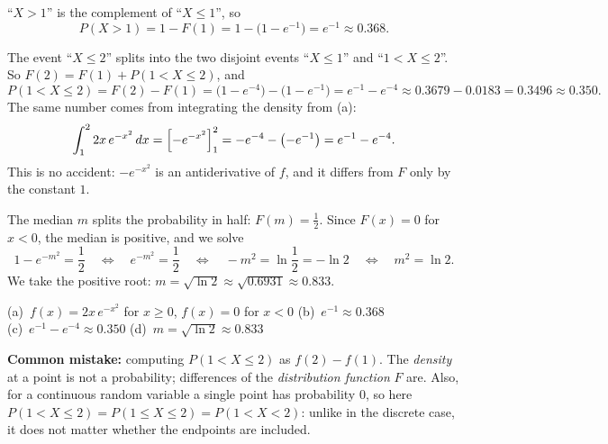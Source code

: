 \begin{solution}
	 ``$X>1$'' is the complement of ``$X\le1$'', so
	\[
		P(X>1)=1-F(1)=1-\bigl(1-e^{-1}\bigr)=e^{-1}\approx 0.368.
	\]

	 The event ``$X\le2$'' splits into the two disjoint events
	``$X\le1$'' and ``$1<X\le2$''. So $F(2)=F(1)+P(1<X\le2)$, and
	\[
		P(1<X\le2)=F(2)-F(1)=\bigl(1-e^{-4}\bigr)-\bigl(1-e^{-1}\bigr)
		=e^{-1}-e^{-4}\approx 0.3679-0.0183=0.3496\approx 0.350.
	\]
	The same number comes from integrating the density from (a):
	\[
		\int_1^2 2x\,e^{-x^2}\,dx=\Bigl[-e^{-x^2}\Bigr]_1^2
		=-e^{-4}-\bigl(-e^{-1}\bigr)=e^{-1}-e^{-4}.
	\]
	This is no accident: $-e^{-x^2}$ is an antiderivative of $f$, and it
	differs from $F$ only by the constant $1$.

	 The median $m$ splits the probability in half: $F(m)=\frac12$.
	Since $F(x)=0$ for $x<0$, the median is positive, and we solve
	\[
		1-e^{-m^2}=\frac12
		\quad\Longleftrightarrow\quad
		e^{-m^2}=\frac12
		\quad\Longleftrightarrow\quad
		-m^2=\ln\frac12=-\ln 2
		\quad\Longleftrightarrow\quad
		m^2=\ln 2.
	\]
	We take the positive root: $m=\sqrt{\ln 2}\approx\sqrt{0.6931}\approx 0.833$.

	\begin{answer}
		(a)~$f(x)=2x\,e^{-x^2}$ for $x\ge0$, $f(x)=0$ for $x<0$ \quad
		(b)~$e^{-1}\approx0.368$ \\
		(c)~$e^{-1}-e^{-4}\approx0.350$ \quad
		(d)~$m=\sqrt{\ln2}\approx0.833$
	\end{answer}
	\begin{remark}
		\textbf{Common mistake:} computing $P(1<X\le2)$ as $f(2)-f(1)$. The
		\emph{density} at a point is not a probability; differences of the
		\emph{distribution function} $F$ are. Also, for a continuous random
		variable a single point has probability $0$, so here
		$P(1<X\le2)=P(1\le X\le2)=P(1<X<2)$: unlike in the discrete case, it
		does not matter whether the endpoints are included.
	\end{remark}
\end{solution}
